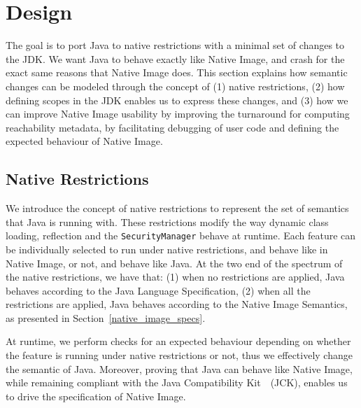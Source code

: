 

\chapter{Design}

The goal is to port Java to native restrictions with a minimal set of changes to the JDK. We want Java to behave exactly like Native Image, and crash for the exact same reasons that Native Image does. 
This section explains how semantic changes can be modeled through the concept of (1) native restrictions, (2) how defining scopes in the JDK enables us to express these changes, and (3) how we can improve Native Image usability by improving the turnaround for computing reachability metadata, by facilitating debugging of user code and defining the expected behaviour of Native Image.

\section{Native Restrictions}
We introduce the concept of native restrictions to represent the set of semantics that Java is running with. These restrictions modify the way dynamic class loading, reflection and the \verb|SecurityManager| behave at runtime. Each feature can be individually selected to run under native restrictions, and behave like in Native Image, or not, and behave like Java.
At the two end of the spectrum of the native restrictions, we have that: (1) when no restrictions are applied, Java behaves according to the Java Language Specification, (2) when all the restrictions are applied, Java behaves according to the Native Image Semantics, as presented in Section~\ref{native_image_specs}. 

At runtime, we perform checks for an expected behaviour depending on whether the feature is running under native restrictions or not, thus we effectively change the semantic of Java.
Moreover, proving that Java can behave like Native Image, while remaining compliant with the Java Compatibility Kit~\cite{noauthor_gaining_nodate}~(JCK), enables us to drive the specification of Native Image.

